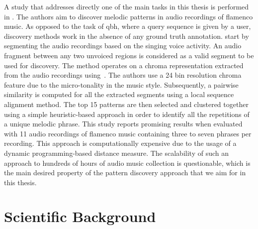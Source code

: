 A study that addresses directly one of the main tasks in this thesis is performed in \cite{kroher2015discovery}. The authors aim to discover melodic patterns in audio recordings of flamenco music. As opposed to the task of \gls{qbh}, where a query sequence is given by a user, discovery methods work in the absence of any ground truth annotation. \cite{kroher2015discovery} start by segmenting the audio recordings based on the singing voice activity. An audio fragment between any two unvoiced regions is considered as a valid segment to be used for discovery. The method operates on a chroma representation extracted from the audio recordings using~\citep{bartsch2005audio}. The authors use a 24 bin resolution chroma feature due to the micro-tonality in the music style. Subsequently, a pairwise similarity is computed for all the extracted segments using a local sequence alignment method. The top 15 patterns are then selected and clustered together using a simple heuristic-based approach in order to identify all the repetitions of a unique melodic phrase. This study reports promising results when evaluated with 11 audio recordings of flamenco music containing three to seven phrases per recording. This approach is computationally expensive due to the usage of a dynamic programming-based distance measure. The scalability of such an approach to hundreds of hours of audio music collection is questionable, which is the main desired property of the pattern discovery approach that we aim for in this thesis. 



%
%


%
\section{Scientific Background}
\label{sec:background_scientific_background}

